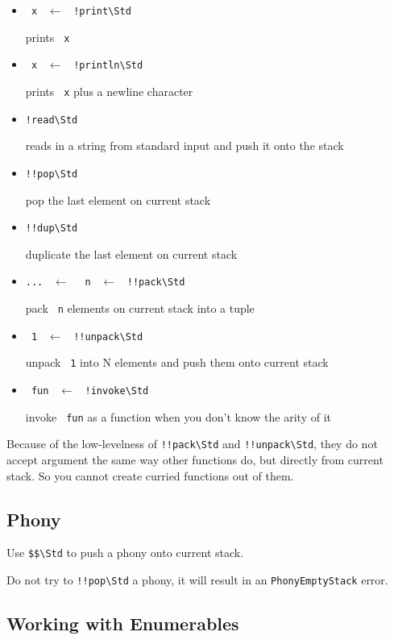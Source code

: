 \documentclass{report}
\newcommand{\mstd}[1]{\texttt{#1\textbackslash Std}}
\newcommand{\mtilde}[1]{\textasciitilde}
\newcommand{\marg}[1]{\texttt{\mtilde ~#1}}
\newcommand{\mla}[0]{~$\leftarrow$ ~}
\begin{document}
\begin{itemize}
\item \marg{x} \mla \mstd{!print}

prints \marg{x}
\item \marg{x} \mla \mstd{!println}

prints \marg{x} plus a newline character
\item \mstd{!read}

reads in a string from standard input and push it onto the stack
\item \mstd{!!pop}

pop the last element on current stack
\item \mstd{!!dup}

duplicate the last element on current stack
\item \texttt{...} \mla \marg{n} \mla \mstd{!!pack}

pack \marg{n} elements on current stack into a tuple
\item \marg1 \mla \mstd{!!unpack}

unpack \marg1 into N elements and push them onto current stack
\item \marg{fun} \mla \mstd{!invoke}

invoke \marg{fun} as a function when you don't know the arity of it
\end{itemize}

\begin{mdframed}[style=hint]
  Because of the low-levelness of \mstd{!!pack} and \mstd{!!unpack}, they do not accept argument the same way other functions do, but directly from current stack. So you cannot create curried functions out of them.
\end{mdframed}

\subsection{Phony}

Use \mstd{\$\$} to push a phony onto current stack.

\begin{mdframed}[style=warning]
  Do not try to \mstd{!!pop} a phony, it will result in an \texttt{PhonyEmptyStack} error.
\end{mdframed}

\subsection{Working with Enumerables}
\end{document}

